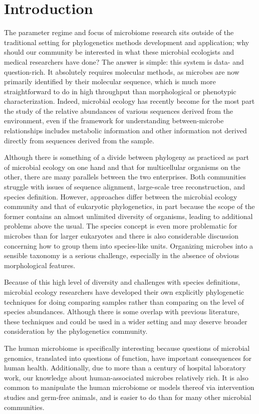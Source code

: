 \documentclass{amsart}
\begin{document}
\section{Introduction}

The parameter regime and focus of microbiome research sits outside of the traditional setting for phylogenetics methods development and application; why should our community be interested in what these microbial ecologists and medical researchers have done?
The answer is simple: this system is data- and question-rich.
It absolutely requires molecular methods, as microbes are now primarily identified by their molecular sequence, which is much more straightforward to do in high throughput than morphological or phenotypic characterization.
Indeed, microbial ecology has recently become for the most part the study of the relative abundances of various sequences derived from the environment, even if the framework for understanding between-microbe relationships includes metabolic information and other information not derived directly from sequences derived from the sample.

Although there is something of a divide between phylogeny as practiced as part of microbial ecology on one hand and that for multicellular organisms on the other, there are many parallels between the two enterprises.
Both communities struggle with issues of sequence alignment, large-scale tree reconstruction, and species definition.
However, approaches differ between the microbial ecology community and that of eukaryotic phylogenetics, in part because the scope of the former contains an almost unlimited diversity of organisms, leading to additional problems above the usual.
The species concept is even more problematic for microbes than for larger eukaryotes and there is also considerable discussion concerning how to group them into species-like units.
Organizing microbes into a sensible taxonomy is a serious challenge, especially in the absence of obvious morphological features.

Because of this high level of diversity and challenges with species definitions, microbial ecology researchers have developed their own explicitly phylogenetic techniques for doing comparing samples rather than comparing on the level of species abundances.
Although there is some overlap with previous literature, these techniques and could be used in a wider setting and may deserve broader consideration by the phylogenetics community.

The human microbiome is specifically interesting because questions of microbial genomics, translated into questions of function, have important consequences for human health.
Additionally, due to more than a century of hospital laboratory work, our knowledge about human-associated microbes relatively rich.
It is also common to manipulate the human microbiome or models thereof via intervention studies and germ-free animals, and is easier to do than for many other microbial communities.
\end{document}

